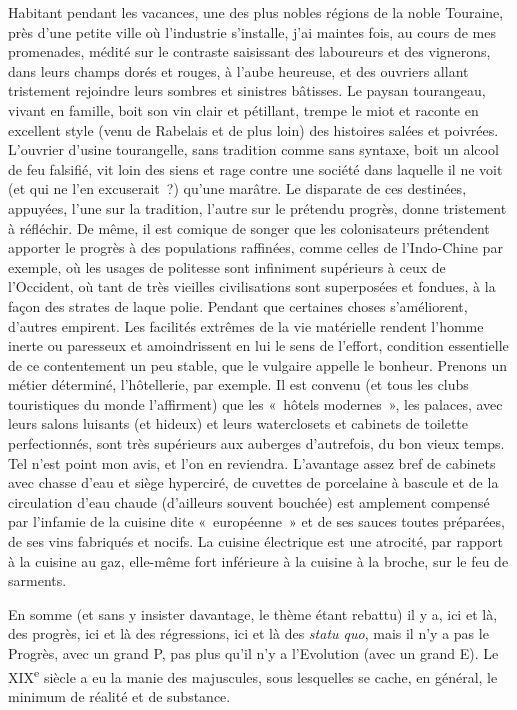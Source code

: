 \documentclass[french,twoside]{book} %
\begin{document}
Habitant pendant les vacances, une des plus nobles régions de la noble Touraine, près d’une petite ville où l’industrie s’installe, j’ai maintes fois, au cours de mes promenades, médité sur le contraste saisissant des laboureurs et des vignerons, dans leurs champs dorés et rouges, à l’aube heureuse, et des ouvriers allant tristement rejoindre leurs sombres et sinistres bâtisses. Le paysan tourangeau, vivant en famille, boit son vin clair et pétillant, trempe le miot et raconte en excellent style (venu de Rabelais et de plus loin) des histoires salées et poivrées. L’ouvrier d’usine tourangelle, sans tradition comme sans syntaxe, boit un alcool de feu falsifié, vit loin des siens et rage contre une société dans laquelle il ne voit (et qui ne l’en excuserait ?) qu’une marâtre. Le disparate de ces destinées, appuyées, l’une sur la tradition, l’autre sur le prétendu progrès, donne tristement à réfléchir. De même, il est comique de songer que les colonisateurs prétendent apporter le progrès à des populations raffinées, comme celles de l’Indo-Chine par exemple, où les usages de politesse sont infiniment supérieurs à ceux de l’Occident, où tant de très vieilles civilisations sont superposées et fondues, à la façon des strates de laque polie. Pendant que certaines choses s’améliorent, d’autres empirent. Les facilités extrêmes de la vie matérielle rendent l’homme inerte ou paresseux et amoindrissent en lui le sens de l’effort, condition essentielle de ce contentement un peu stable, que le vulgaire appelle le bonheur. Prenons un métier déterminé, l’hôtellerie, par exemple. Il est convenu (et tous les clubs touristiques du monde l’affirment) que les « hôtels modernes », les palaces, avec leurs salons luisants (et hideux) et leurs waterclosets et cabinets de toilette perfectionnés, sont très supérieurs aux auberges d’autrefois, du bon vieux temps. Tel n’est point mon avis, et l’on en reviendra. L’avantage assez bref de cabinets avec chasse d’eau et siège hyperciré, de cuvettes de porcelaine à bascule et de la circulation d’eau chaude (d’ailleurs souvent bouchée) est amplement compensé par l’infamie de la cuisine dite « européenne » et de ses sauces toutes préparées, de ses vins fabriqués et nocifs. La cuisine électrique est une atrocité, par rapport à la cuisine au gaz, elle-même fort inférieure à la cuisine à la broche, sur le feu de sarments.\par
En somme (et sans y insister davantage, le thème étant rebattu) il y a, ici et là, des progrès, ici et là des régressions, ici et là des {\itshape statu quo}, mais il n’y a pas le Progrès, avec un grand P, pas plus qu’il n’y a l’Evolution (avec un grand E). Le XIX\textsuperscript{e} siècle a eu la manie des majuscules, sous lesquelles se cache, en général, le minimum de réalité et de substance.\par
\end{document}
